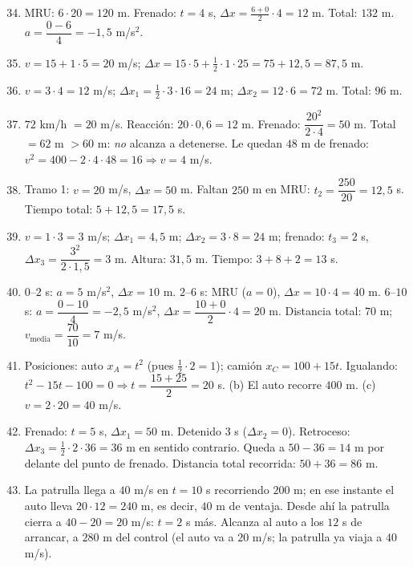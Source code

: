 \documentclass[12pt, letterpaper]{article}
\begin{document}
  \begin{enumerate}[leftmargin=*, label=\textbf{\arabic*.}]
    \setcounter{enumi}{33}
    \item MRU: $6 \cdot 20 = 120$ m. Frenado: $t = 4$ s, $\Delta x = \frac{6 + 0}{2} \cdot 4 = 12$ m. Total: $132$ m. $a = \dfrac{0 - 6}{4} = -1{,}5$ m/s$^2$.
    \item $v = 15 + 1 \cdot 5 = 20$ m/s; $\Delta x = 15 \cdot 5 + \tfrac{1}{2} \cdot 1 \cdot 25 = 75 + 12{,}5 = 87{,}5$ m.
    \item $v = 3 \cdot 4 = 12$ m/s; $\Delta x_1 = \tfrac{1}{2} \cdot 3 \cdot 16 = 24$ m; $\Delta x_2 = 12 \cdot 6 = 72$ m. Total: $96$ m.
    \item $72$ km/h $= 20$ m/s. Reacción: $20 \cdot 0{,}6 = 12$ m. Frenado: $\dfrac{20^2}{2 \cdot 4} = 50$ m. Total $= 62$ m $> 60$ m: \emph{no} alcanza a detenerse. Le quedan $48$ m de frenado: $v^2 = 400 - 2 \cdot 4 \cdot 48 = 16 \Rightarrow v = 4$ m/s.
    \item Tramo 1: $v = 20$ m/s, $\Delta x = 50$ m. Faltan $250$ m en MRU: $t_2 = \dfrac{250}{20} = 12{,}5$ s. Tiempo total: $5 + 12{,}5 = 17{,}5$ s.
    \item $v = 1 \cdot 3 = 3$ m/s; $\Delta x_1 = 4{,}5$ m; $\Delta x_2 = 3 \cdot 8 = 24$ m; frenado: $t_3 = 2$ s, $\Delta x_3 = \dfrac{3^2}{2 \cdot 1{,}5} = 3$ m. Altura: $31{,}5$ m. Tiempo: $3 + 8 + 2 = 13$ s.
    \item $0$--$2$ s: $a = 5$ m/s$^2$, $\Delta x = 10$ m. $2$--$6$ s: MRU ($a = 0$), $\Delta x = 10 \cdot 4 = 40$ m. $6$--$10$ s: $a = \dfrac{0 - 10}{4} = -2{,}5$ m/s$^2$, $\Delta x = \dfrac{10 + 0}{2} \cdot 4 = 20$ m. Distancia total: $70$ m; $v_{\text{media}} = \dfrac{70}{10} = 7$ m/s.
    \item Posiciones: auto $x_A = t^2$ (pues $\tfrac{1}{2} \cdot 2 = 1$); camión $x_C = 100 + 15t$. Igualando: $t^2 - 15t - 100 = 0 \Rightarrow t = \dfrac{15 + 25}{2} = 20$ s. (b) El auto recorre $400$ m. (c) $v = 2 \cdot 20 = 40$ m/s.
    \item Frenado: $t = 5$ s, $\Delta x_1 = 50$ m. Detenido $3$ s ($\Delta x_2 = 0$). Retroceso: $\Delta x_3 = \tfrac{1}{2} \cdot 2 \cdot 36 = 36$ m en sentido contrario. Queda a $50 - 36 = 14$ m por delante del punto de frenado. Distancia total recorrida: $50 + 36 = 86$ m.
    \item La patrulla llega a $40$ m/s en $t = 10$ s recorriendo $200$ m; en ese instante el auto lleva $20 \cdot 12 = 240$ m, es decir, $40$ m de ventaja. Desde ahí la patrulla cierra a $40 - 20 = 20$ m/s: $t = 2$ s más. Alcanza al auto a los $12$ s de arrancar, a $280$ m del control (el auto va a $20$ m/s; la patrulla ya viaja a $40$ m/s).
  \end{enumerate}
\end{document}
